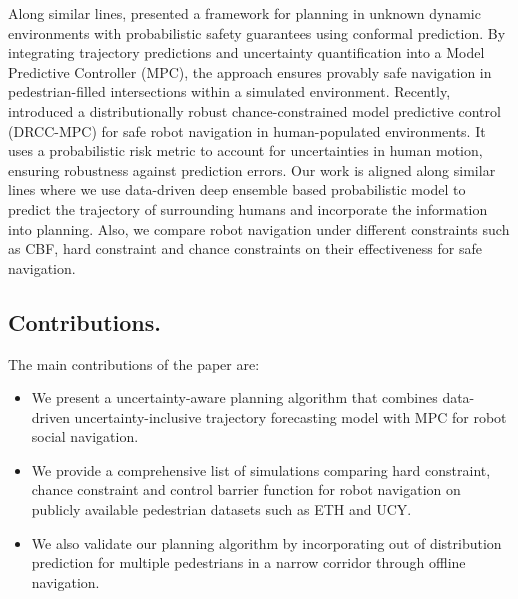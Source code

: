 Along similar lines, \cite{Lindemann}  presented a framework for planning in unknown dynamic environments with probabilistic safety guarantees using conformal prediction. By integrating trajectory predictions and uncertainty quantification into a Model Predictive Controller (MPC), the approach ensures provably safe navigation in  pedestrian-filled intersections within a simulated environment. 
Recently, \cite{DRCC_MPC}  introduced a distributionally robust chance-constrained model predictive control (DRCC-MPC) for safe robot navigation in human-populated environments. It uses a probabilistic risk metric to account for uncertainties in human motion, ensuring robustness against prediction errors. Our work is aligned along similar lines where we use data-driven deep ensemble based probabilistic  model to predict the trajectory of  surrounding humans \cite{DE_Anshul} and incorporate the information into planning. Also, we compare  robot navigation under different constraints such as CBF, hard constraint and chance constraints on their effectiveness for safe navigation.



\subsection*{\textbf{Contributions.}} The main contributions of the paper are:
\begin{itemize}
    \item   We present a uncertainty-aware planning algorithm that combines data-driven uncertainty-inclusive trajectory forecasting model with MPC for robot social navigation.

    \item We provide a comprehensive list of simulations comparing hard constraint, chance constraint and control barrier function for robot navigation on  publicly available pedestrian datasets such as ETH and UCY.

    \item We also validate our planning algorithm by incorporating out of distribution prediction for multiple pedestrians in a narrow corridor through offline navigation. 

\end{itemize}



